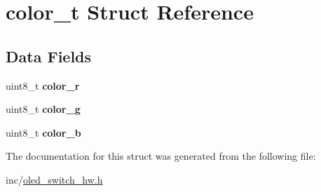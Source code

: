 \hypertarget{structcolor__t}{}\section{color\+\_\+t Struct Reference}
\label{structcolor__t}
\subsection*{Data Fields}
\begin{DoxyCompactItemize}
\item 
\hypertarget{structcolor__t_a6859a2b77e80c342f63659e9ef0256f1}{}uint8\+\_\+t {\bfseries color\+\_\+r}\label{structcolor__t_a6859a2b77e80c342f63659e9ef0256f1}

\item 
\hypertarget{structcolor__t_ae90c968013867a5583221ea5f4a2257a}{}uint8\+\_\+t {\bfseries color\+\_\+g}\label{structcolor__t_ae90c968013867a5583221ea5f4a2257a}

\item 
\hypertarget{structcolor__t_ac1756f5c8b8f8a6c880c1709ab0edc23}{}uint8\+\_\+t {\bfseries color\+\_\+b}\label{structcolor__t_ac1756f5c8b8f8a6c880c1709ab0edc23}

\end{DoxyCompactItemize}


The documentation for this struct was generated from the following file\+:\begin{DoxyCompactItemize}
\item 
inc/\hyperlink{oled__switch__hw_8h}{oled\+\_\+switch\+\_\+hw.\+h}\end{DoxyCompactItemize}
